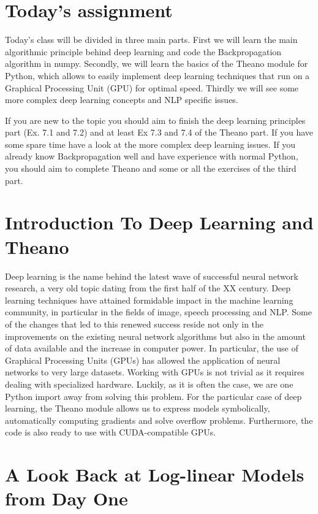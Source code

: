 \section{Today’s assignment}
Today's class will be divided in three main parts. First we will learn the main algorithmic principle behind deep learning and code the Backpropagation algorithm in numpy.  Secondly, we will learn the basics of the Theano module for Python, which allows to easily implement deep learning techniques that run on a Graphical Processing Unit (GPU) for optimal speed. Thirdly we will see some more complex deep learning concepts and NLP specific issues.

If you are new to the topic you should aim to finish the deep learning principles part (Ex. 7.1 and 7.2) and at least Ex 7.3 and 7.4 of the Theano part. If you have some spare time have a look at the more complex deep learning issues. If you already know Backpropagation well and have experience with normal Python, you should aim to complete Theano and some or all the exercises of the third part. 

\section{Introduction To Deep Learning and Theano}

Deep learning is the name behind the latest wave of successful neural network research, a very old topic dating from the first half of the XX century. Deep learning techniques have attained formidable impact in the machine learning community, in particular in the fields of image, speech processing and NLP. Some of the changes that led to this renewed success reside not only in the improvements on the existing neural network algorithms but also in the amount of data available and the increase in computer power. In particular, the use of Graphical Processing Units (GPUs) has allowed the application of neural networks to very large datasets. Working with GPUs is not trivial as it requires dealing with specialized hardware. Luckily, as it is often the case, we are one Python import away from solving this problem. For the particular case of deep learning, the Theano\footnotemark{} module allows us to express models symbolically, automatically computing gradients and solve overflow problems. Furthermore, the code is also ready to use with CUDA-compatible GPUs.

\section{A Look Back at Log-linear Models from Day One} 

